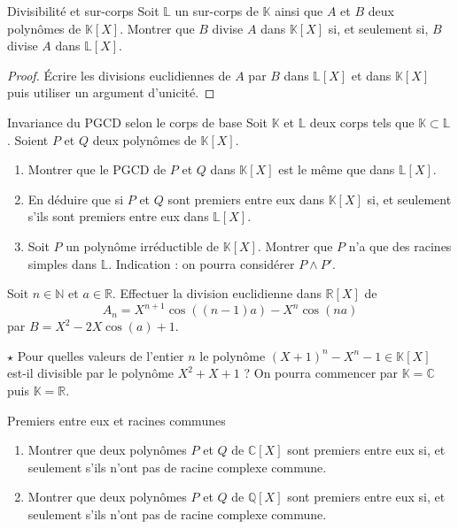 \documentclass[french,a4paper]{article}
\newcommand{\N}{\mathbb{N}}
\newcommand{\Q}{\mathbb{Q}}
\newcommand{\R}{\mathbb{R}}
\newcommand{\C}{\mathbb{C}}
\newcommand{\K}{\mathbb{K}}
\renewcommand{\L}{\mathbb{L}}
\theoremstyle{plain}
\theoremstyle{definition}
\theoremstyle{remark}
\begin{document}
\begin{ex}[Moulin.AG.61]{Divisibilité et sur-corps}
	Soit $\L$ un sur-corps de $\K$ ainsi que $A$ et $B$ deux polynômes de $\K[X]$. Montrer que $B$ divise $A$ dans $\K[X]$ si, et seulement si, $B$ divise $A$ dans $\L[X]$.
\end{ex}
\begin{proof}
	Écrire les divisions euclidiennes de $A$ par $B$ dans $\L[X]$ et dans $\K[X]$ puis utiliser un argument d'unicité.
\end{proof}

\begin{ex}[Châteaux]{Invariance du PGCD selon le corps de base}
	Soit $\K$ et $\L$ deux corps tels que $\K\subset\L$. Soient $P$ et $Q$ deux polynômes de $\K[X]$.
	\begin{enumerate}
		\item Montrer que le PGCD de $P$ et $Q$ dans $\K[X]$ est le même que dans $\L[X]$.
		\item En déduire que si $P$ et $Q$ sont premiers entre eux dans $\K[X]$ si, et seulement s'ils sont premiers entre eux dans $\L[X]$.
		\item Soit $P$ un polynôme irréductible de $\K[X]$. Montrer que $P$ n'a que des racines simples dans $\L$. Indication : on pourra considérer $P\wedge P'$.
	\end{enumerate}
\end{ex}

\begin{ex}[Moulin.AG.62]{}
	Soit $n\in\N$ et $a\in\R$. Effectuer la division euclidienne dans $\R[X]$ de $$A_n=X^{n+1}\cos((n-1)a)-X^n\cos(na)$$ par $B=X^2-2X\cos(a)+1$.
\end{ex}

\begin{ex}[Moulin.AG.63]{$\star$}
	Pour quelles valeurs de l'entier $n$ le polynôme $(X+1)^n-X^n-1\in\K[X]$ est-il divisible par le polynôme $X^2+X+1$ ? On pourra commencer par $\K=\C$ puis $\K=\R$.
\end{ex}

\begin{ex}[Moulin.AG.64]{Premiers entre eux et racines communes}
	\begin{enumerate}
		\item Montrer que deux polynômes $P$ et $Q$ de $\C[X]$ sont premiers entre eux si, et seulement s'ils n'ont pas de racine complexe commune.
		\item Montrer que deux polynômes $P$ et $Q$ de $\Q[X]$ sont premiers entre eux si, et seulement s'ils n'ont pas de racine complexe commune.
	\end{enumerate}
\end{ex}
\end{document}
